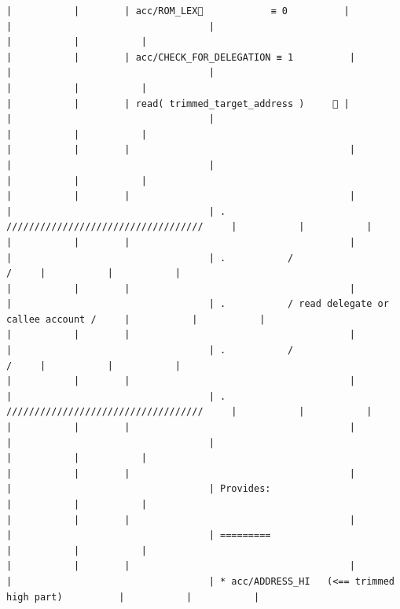\documentclass[varwidth=\maxdimen,margin=0.5cm,multi={verbatim}]{standalone}
\begin{document}
\begin{verbatim}
|           |        | acc/ROM_LEX🚩            ≡ 0          |                                 |                                   |                                                     |           |           |
|           |        | acc/CHECK_FOR_DELEGATION ≡ 1          |                                 |                                   |                                                     |           |           |
|           |        | read( trimmed_target_address )     👋 |                                 |                                   |                                                     |           |           |
|           |        |                                       |                                 |                                   |                                                     |           |           |
|           |        |                                       |                                 |                                   | .           ///////////////////////////////////     |           |           |
|           |        |                                       |                                 |                                   | .           /                                 /     |           |           |
|           |        |                                       |                                 |                                   | .           / read delegate or callee account /     |           |           |
|           |        |                                       |                                 |                                   | .           /                                 /     |           |           |
|           |        |                                       |                                 |                                   | .           ///////////////////////////////////     |           |           |
|           |        |                                       |                                 |                                   |                                                     |           |           |
|           |        |                                       |                                 |                                   | Provides:                                           |           |           |
|           |        |                                       |                                 |                                   | =========                                           |           |           |
|           |        |                                       |                                 |                                   | * acc/ADDRESS_HI   (<== trimmed high part)          |           |           |

\end{verbatim}
\end{document}
